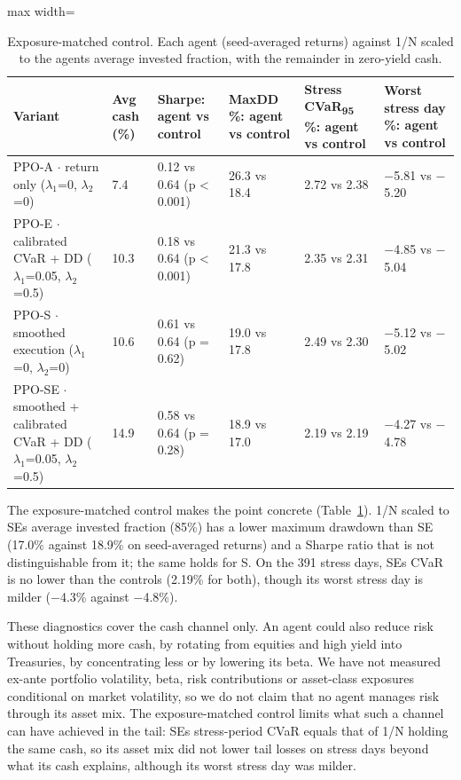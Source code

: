 \documentclass[11pt]{article}
\begin{document}
\begin{table}[!htbp]
\centering\scriptsize
\caption{Exposure-matched control. Each agent (seed-averaged returns) against 1/N scaled to the agent\textquotesingle s average invested fraction, with the remainder in zero-yield cash.\label{tab-delev-no}}
\begin{adjustbox}{max width=\linewidth}
\begin{tabular}{@{}llllll@{}}
\toprule
Variant & Avg cash (\%) & Sharpe: agent vs control & MaxDD \%: agent vs control & Stress CVaR\textsubscript{95} \%: agent vs control & Worst stress day \%: agent vs control \\
\midrule
PPO-A $\cdot$ return only {($\lambda_1$=0, $\lambda_2$=0)} & 7.4 & 0.12 vs 0.64 (p \textless{} 0.001) & 26.3 vs 18.4 & 2.72 vs 2.38 & $-$5.81 vs $-$5.20 \\
PPO-E $\cdot$ calibrated CVaR + DD {($\lambda_1$=0.05, $\lambda_2$=0.5)} & 10.3 & 0.18 vs 0.64 (p \textless{} 0.001) & 21.3 vs 17.8 & 2.35 vs 2.31 & $-$4.85 vs $-$5.04 \\
PPO-S $\cdot$ smoothed execution {($\lambda_1$=0, $\lambda_2$=0)} & 10.6 & 0.61 vs 0.64 (p = 0.62) & 19.0 vs 17.8 & 2.49 vs 2.30 & $-$5.12 vs $-$5.02 \\
PPO-SE $\cdot$ smoothed + calibrated CVaR + DD {($\lambda_1$=0.05, $\lambda_2$=0.5)} & 14.9 & 0.58 vs 0.64 (p = 0.28) & 18.9 vs 17.0 & 2.19 vs 2.19 & $-$4.27 vs $-$4.78 \\
\bottomrule
\end{tabular}
\end{adjustbox}
\end{table}

The exposure-matched control makes the point concrete (Table~\ref{tab-delev-no}). 1/N scaled to SE\textquotesingle s average invested fraction (85\%) has a lower maximum drawdown than SE (17.0\% against 18.9\% on seed-averaged returns) and a Sharpe ratio that is not distinguishable from it; the same holds for S. On the 391 stress days, SE\textquotesingle s CVaR is no lower than the control\textquotesingle s (2.19\% for both), though its worst stress day is milder ($-$4.3\% against $-$4.8\%).

These diagnostics cover the cash channel only. An agent could also reduce risk without holding more cash, by rotating from equities and high yield into Treasuries, by concentrating less or by lowering its beta. We have not measured ex-ante portfolio volatility, beta, risk contributions or asset-class exposures conditional on market volatility, so we do not claim that no agent manages risk through its asset mix. The exposure-matched control limits what such a channel can have achieved in the tail: SE\textquotesingle s stress-period CVaR equals that of 1/N holding the same cash, so its asset mix did not lower tail losses on stress days beyond what its cash explains, although its worst stress day was milder.
\end{document}
